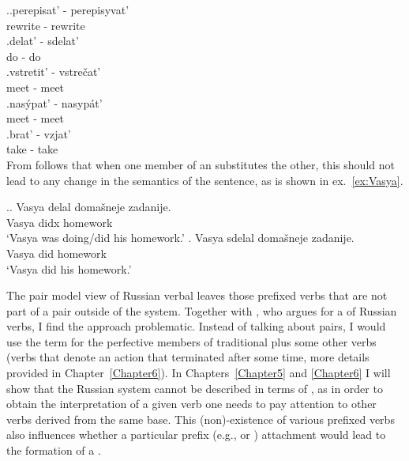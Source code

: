\ex.\ag.\label{pair1}perepisat'\textsuperscript{\PF} - perepisyvat'\textsuperscript{\IPF}\\
rewrite - rewrite\\
\bg.\label{pair2}delat'\textsuperscript{\IPF} - sdelat'\textsuperscript{\PF}\\
do - do\\
\bg.\label{pair3}vstretit'\textsuperscript{\PF} - vstre\v{c}at'\textsuperscript{\IPF}\\
meet - meet\\
\bg.\label{pair4}nas\'ypat'\textsuperscript{\PF} - nasyp\'at'\textsuperscript{\IPF}\\
meet - meet\\
\bg.\label{pair5}brat'\textsuperscript{\IPF} - vzjat'\textsuperscript{\PF}\\
take - take\\

From  follows that when one member of an  substitutes the other, this should not lead to any change in the semantics of the sentence, as is shown in ex.~\ref{ex:Vasya}.

\ex.\label{ex:Vasya}\ag. Vasya delal\textsuperscript{\IPF} {doma\v{s}neje zadanije}.\\
Vasya didx homework\\
\trans `Vasya was doing/did his homework.'
\bg. Vasya sdelal\textsuperscript{\PF} {doma\v{s}neje zadanije}.\\
Vasya did homework\\
\trans `Vasya did his homework.'

The pair model view of Russian verbal  leaves those prefixed verbs that are not part of a pair outside of the system. Together with \citet{Janda:07a}, who argues for a  of Russian verbs, I find the  approach problematic. Instead of talking about pairs, I would use the term \textit{} for the perfective members of traditional  plus some other verbs (verbs that denote an action that terminated after some time, more details provided in Chapter~\ref{Chapter6}). In Chapters~\ref{Chapter5} and \ref{Chapter6} I will show that the Russian  system cannot be described in terms of , as in order to obtain the interpretation of a given verb one needs to pay attention to other verbs derived from the same base. This (non)-existence of various prefixed verbs also influences whether a particular prefix (e.g.,  or ) attachment would lead to the formation of a .

